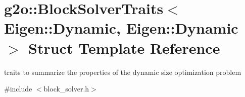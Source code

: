 \hypertarget{structg2o_1_1_block_solver_traits_3_01_eigen_1_1_dynamic_00_01_eigen_1_1_dynamic_01_4}{}\section{g2o\+:\+:Block\+Solver\+Traits$<$ Eigen\+:\+:Dynamic, Eigen\+:\+:Dynamic $>$ Struct Template Reference}
\label{structg2o_1_1_block_solver_traits_3_01_eigen_1_1_dynamic_00_01_eigen_1_1_dynamic_01_4}


traits to summarize the properties of the dynamic size optimization problem  




{\ttfamily \#include $<$block\+\_\+solver.\+h$>$}

